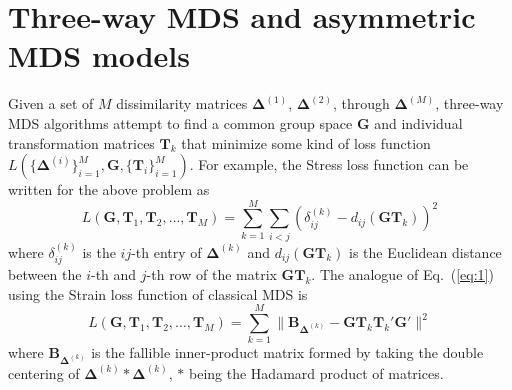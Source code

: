 \documentclass[11pt]{asaproc}
\begin{document}
\section{Three-way MDS and asymmetric MDS models}
\label{sec:three-way-mds}
Given a set of $M$ dissimilarity matrices $\bm{\Delta}^{(1)}$,
$\bm{\Delta}^{(2)}$, through $\bm{\Delta}^{(M)}$, three-way MDS
algorithms attempt to find a common group space $\mathbf{G}$ and
individual transformation matrices $\mathbf{T}_k$ that minimize some kind
of loss function $L(\{\bm{\Delta}^{(i)}\}_{i=1}^{M}, \mathbf{G},
\{\mathbf{T}_i\}_{i=1}^{M})$. For example, the Stress loss function
\citep{kruskal64:_nonmet} can be written for the above problem as
\begin{equation}
  \label{eq:1}
  L(\mathbf{G}, \mathbf{T}_1, \mathbf{T}_{2}, \dots, \mathbf{T}_M) =
  \sum_{k = 1}^{M}\sum_{i < j} (\delta_{ij}^{(k)} -
  d_{ij}(\mathbf{G}\mathbf{T}_k))^2
\end{equation}
where $\delta_{ij}^{(k)}$ is the $ij$-th entry of $\bm{\Delta}^{(k)}$
and $d_{ij}(\mathbf{G}\mathbf{T}_k)$ is the Euclidean distance between
the $i$-th and $j$-th row of the matrix
$\mathbf{G}\mathbf{T}_k$. The analogue of Eq.~(\ref{eq:1}) using the
Strain loss function of classical MDS \citep{torgesen52:_multid,gower66:_some} is 
\begin{equation}
  \label{eq:2}
  L(\mathbf{G}, \mathbf{T}_1, \mathbf{T}_2, \dots, \mathbf{T}_M)
  = \sum_{k = 1}^{M}\| \mathbf{B}_{\bm{\Delta}^{(k)}} -
  \mathbf{G}\mathbf{T}_k \mathbf{T}_k' \mathbf{G}' \|^2 
\end{equation}
where $\mathbf{B}_{\bm{\Delta}^{(k)}}$ is the fallible inner-product
  matrix formed by taking the double centering of $\bm{\Delta}^{(k)}
  \ast \bm{\Delta}^{(k)}$, $\ast$ being the Hadamard product of
  matrices. \\ \\ 
\end{document}
